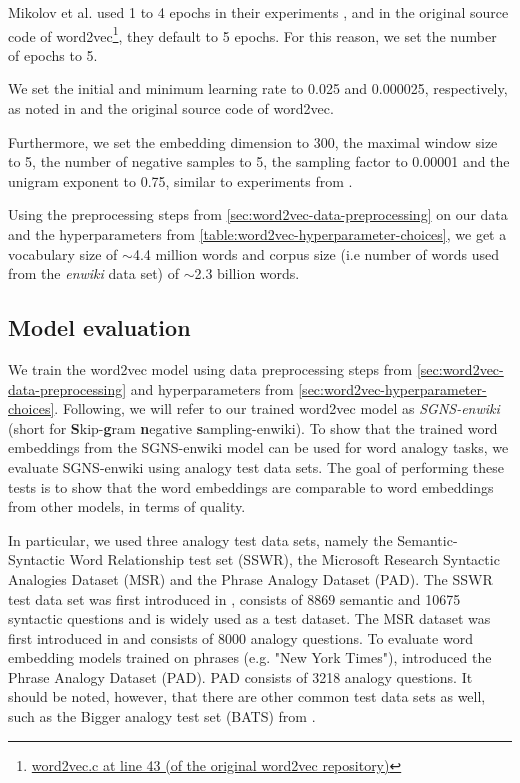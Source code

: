 Mikolov et al. used 1 to 4 epochs in their experiments \cite{mikolov2013a, mikolov2013b}, and in the original source code of word2vec\footnote{\href{https://github.com/tmikolov/word2vec/blob/e092540633572b883e25b367938b0cca2cf3c0e7/word2vec.c/\#L43}{word2vec.c at line 43 (of the original word2vec repository)}}, they default to 5 epochs. For this reason, we set the number of epochs to 5.

We set the initial and minimum learning rate to 0.025 and 0.000025, respectively, as noted in \cite{mikolov2013a} and the original source code of word2vec.

Furthermore, we set the embedding dimension to 300, the maximal window size to 5, the number of negative samples to 5, the sampling factor to 0.00001 and the unigram exponent to 0.75, similar to experiments from \cite{mikolov2013b}.

Using the preprocessing steps from \cref{sec:word2vec-data-preprocessing} on our data and the hyperparameters from \cref{table:word2vec-hyperparameter-choices}, we get a vocabulary size of $\sim$4.4 million words and corpus size (i.e number of words used from the \textit{enwiki} data set) of $\sim$2.3 billion words.

\subsection{Model evaluation}
We train the word2vec model using data preprocessing steps from \cref{sec:word2vec-data-preprocessing} and hyperparameters from \cref{sec:word2vec-hyperparameter-choices}. Following, we will refer to our trained word2vec model as \textit{SGNS-enwiki} (short for \textbf{S}kip-\textbf{g}ram \textbf{n}egative \textbf{s}ampling-enwiki). To show that the trained word embeddings from the SGNS-enwiki model can be used for word analogy tasks, we evaluate SGNS-enwiki using analogy test data sets. The goal of performing these tests is to show that the word embeddings are comparable to word embeddings from other models, in terms of quality.

In particular, we used three analogy test data sets, namely the Semantic-Syntactic Word Relationship test set (SSWR), the Microsoft Research Syntactic Analogies Dataset (MSR) and the Phrase Analogy Dataset (PAD). The SSWR test data set was first introduced in \cite{mikolov2013a}, consists of 8869 semantic and 10675 syntactic questions and is widely used as a test dataset. The MSR dataset was first introduced in \cite{mikolov-etal-2013-linguistic} and consists of 8000 analogy questions. To evaluate word embedding models trained on phrases (e.g. "New York Times"), \cite{mikolov2013b} introduced the Phrase Analogy Dataset (PAD). PAD consists of 3218 analogy questions. It should be noted, however, that there are other common test data sets as well, such as the Bigger analogy test set (BATS) from \cite{gladkova-etal-2016-analogy}.

